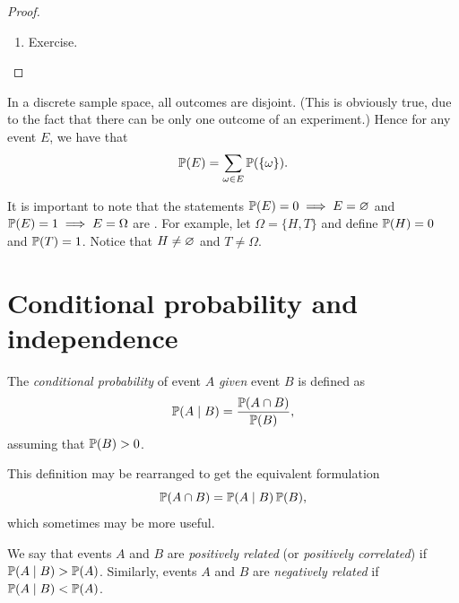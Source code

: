 \begin{proof}
\begin{enumerate}
      \begin{align*}
        \prob(B) &= \prob \left( \, \bigcup_{i = 1}^{\infty} B_i \right) \\
                 &= \sum_{i = 1}^{\infty} \prob(B_i) \\
                 &= \lim_{n \to \infty} \sum_{i = 1}^{n} \prob(B_i) \\
                 &= \lim_{n \to \infty} \prob \left( \, \bigcup_{i = 1}^{n} B_i \right),
      \end{align*}
      with the last step being due to finite additivity. But $\bigcup_{i = 1}^{n} B_i = A_n$, so we have \[
        \prob(B) = \lim_{n \to \infty} \prob(A_n)
      \] as required.
    \item Exercise. \qedhere
  \end{enumerate}
\end{proof}

In a discrete sample space, all outcomes are disjoint. (This is obviously true, due to the fact that there can be only one outcome of an experiment.) Hence for any event $E$, we have that \[
  \operatorname{\mathbb{P}}(E) = \sum_{\omega \in E} \operatorname{\mathbb{P}}(\{\omega\}).
\] 
\begin{remark}
  It is important to note that the statements $\operatorname{\mathbb{P}}(E) = 0 \implies E = \varnothing$ and $\operatorname{\mathbb{P}}(E) = 1 \implies E = \Omega$ are . For example, let $\Omega = \{H, T\}$ and define $\operatorname{\mathbb{P}}(H) = 0$ and $\operatorname{\mathbb{P}}(T) = 1$. Notice that $H \neq \varnothing$ and $T \neq \Omega$.
\end{remark}

\section{Conditional probability and independence}

\begin{definition}
  The \emph{conditional probability} of event $A$ \emph{given} event $B$ is defined as \[
    \operatorname{\mathbb{P}}(A \mid B) = \frac{\operatorname{\mathbb{P}}(A \cap B)}{\operatorname{\mathbb{P}}(B)},
  \] assuming that $\operatorname{\mathbb{P}}(B) > 0$.
\end{definition}

This definition may be rearranged to get the equivalent formulation \[
  \operatorname{\mathbb{P}}(A \cap B) = \operatorname{\mathbb{P}}(A \mid B) \operatorname{\mathbb{P}}(B),
\] which sometimes may be more useful.

\begin{definition}
  We say that events $A$ and $B$ are \emph{positively related} (or \emph{positively correlated}) if $\operatorname{\mathbb{P}}(A \mid B) > \operatorname{\mathbb{P}}(A)$. Similarly, events  $A$ and $B$ are \emph{negatively related} if $\operatorname{\mathbb{P}}(A \mid B) < \operatorname{\mathbb{P}}(A)$.
\end{definition}

